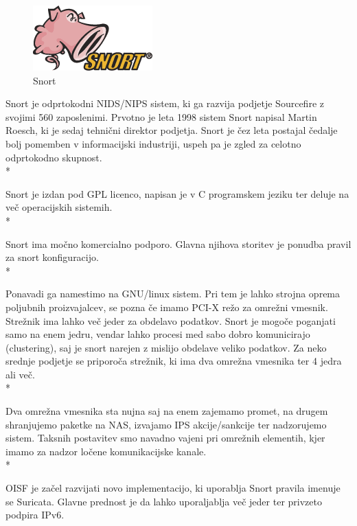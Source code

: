 \documentclass[12pt]{article}
\begin{document}
\begin{figure}[htb]
\begin{center}
\includegraphics[scale=0.8]{Snort_ids_logo.png}
\end{center}
\caption{Snort}
\label{snort_img}
\end{figure}

Snort\cite{snort} je odprtokodni NIDS/NIPS sistem, ki ga razvija podjetje Sourcefire\cite{sourcefire} z svojimi 560 zaposlenimi.
Prvotno je leta 1998 sistem Snort napisal Martin Roesch, ki je sedaj tehnični direktor podjetja. 
Snort je čez leta postajal čedalje bolj pomemben v informacijski industriji, uspeh pa je zgled za celotno odprtokodno skupnost.
\\*

Snort je izdan pod GPL licenco, napisan je v C programskem jeziku ter deluje na več operacijskih sistemih.
\\*

Snort ima močno komercialno podporo. Glavna njihova storitev je ponudba pravil za snort konfiguracijo.
\\*

Ponavadi ga namestimo na GNU/linux sistem. Pri tem je lahko strojna oprema poljubnih proizvajalcev, se pozna če imamo PCI-X režo za omrežni vmesnik.
Strežnik ima lahko več jeder za obdelavo podatkov. Snort je mogoče poganjati samo na enem jedru, vendar lahko procesi med sabo dobro komunicirajo (clustering), saj je snort narejen z mislijo obdelave veliko podatkov.
Za neko srednje podjetje se priporoča strežnik, ki ima dva omrežna vmesnika ter 4 jedra ali več.
\\*

Dva omrežna vmesnika sta nujna saj na enem zajemamo promet, na drugem shranjujemo paketke na NAS, izvajamo IPS akcije/sankcije ter nadzorujemo sistem. Taksnih postavitev smo navadno vajeni pri omrežnih elementih, kjer imamo za nadzor ločene komunikacijske kanale.
\\*

OISF\cite{oisf} je začel razvijati novo implementacijo, ki uporablja Snort pravila imenuje se Suricata.
Glavne prednost je da lahko uporaljablja več jeder ter privzeto podpira IPv6.

\end{document}
